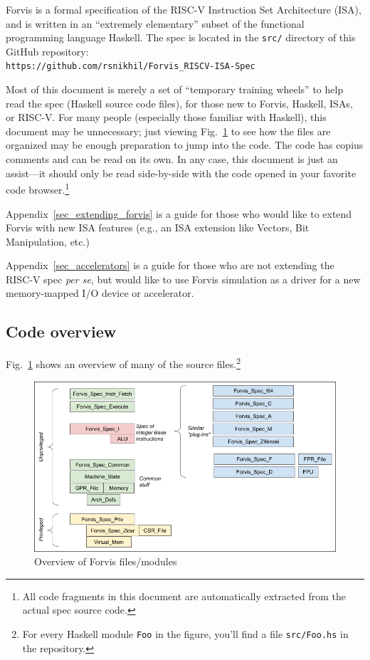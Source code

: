 \documentclass[11pt]{article}
\newcommand{\hmm}{\hspace*{2em}}
\begin{document}
\label{sec_intro}

Forvis is a formal specification of the RISC-V Instruction Set
Architecture (ISA), and is written in an ``extremely elementary''
subset of the functional programming language Haskell.  The spec is
located in the \verb|src/| directory of this GitHub repository: \\
\hmm \verb|https://github.com/rsnikhil/Forvis_RISCV-ISA-Spec|

Most of this document is merely a set of ``temporary training wheels''
to help read the spec (Haskell source code files), for those new to
Forvis, Haskell, ISAs, or RISC-V.  For many people (especially those
familiar with Haskell), this document may be unnecessary; just viewing
Fig.~\ref{Fig_Overview} to see how the files are organized may be
enough preparation to jump into the code.  The code has copius
comments and can be read on its own.  In any case, this document is
just an assist---it should only be read side-by-side with the code
opened in your favorite code browser.\footnote{All code fragments in
this document are automatically extracted from the actual spec source
code.}

Appendix~\ref{sec_extending_forvis} is a guide for those who would
like to extend Forvis with new ISA features (e.g., an ISA extension
like Vectors, Bit Manipulation, etc.)

Appendix~\ref{sec_accelerators} is a guide for those who are not
extending the RISC-V spec \emph{per se}, but would like to use Forvis
simulation as a driver for a new memory-mapped I/O device or
accelerator.


\subsection{Code overview}

Fig.~\ref{Fig_Overview} shows an overview of many of the source
files.\footnote{For every Haskell module {\tt Foo} in the figure,
you'll find a file {\tt src/Foo.hs} in the repository.}

\begin{figure}[htbp]
    \centering
    \includegraphics[width=6in]{Figs/Fig_Overview}
    \caption{\label{Fig_Overview}
                    Overview of Forvis files/modules}
\end{figure}
\end{document}
